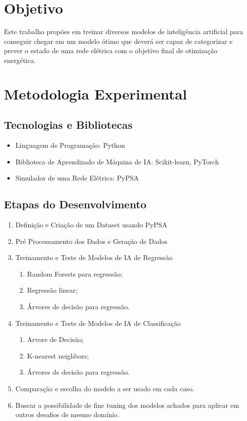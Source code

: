 \documentclass[a4paper,12pt]{article}
\begin{document}
\section{Objetivo}

Este trabalho propões em treinar diversos modelos de inteligência artificial para conseguir chegar em um modelo ótimo que deverá ser capaz de categorizar e prever o estado de uma rede elétrica com o objetivo final de otimização energética.

\section{Metodologia Experimental}

\subsection{Tecnologias e Bibliotecas}
\begin{itemize}
    \item Linguagem de Programação: Python
    \item Biblioteca de Aprendizado de Máquina de IA: Scikit-learn, PyTorch
    \item Simulador de uma Rede Elétrica: PyPSA
\end{itemize}

\subsection{Etapas do Desenvolvimento}
\begin{enumerate}
    \item Definição e Criação de um Dataset usando PyPSA
    \item Pré Processamento dos Dados e Geração de Dados
    \item Treinamento e Teste de Modelos de IA de Regressão \begin{enumerate}
              \item Random Forests para regressão;
              \item Regressão linear;
              \item Árvores de decisão para regressão.
          \end{enumerate}
    \item Treinamento e Teste de Modelos de IA de Classificação \begin{enumerate}
              \item Arvore de Decisão;
              \item K-nearest neighbors;
              \item Árvores de decisão para regressão.
          \end{enumerate}
    \item Comparação e escolha do modelo a ser usado em cada caso.
    \item Buscar a possibilidade de fine tuning dos modelos achados para aplicar em outros desafios de mesmo domínio.
\end{enumerate}
\end{document}
